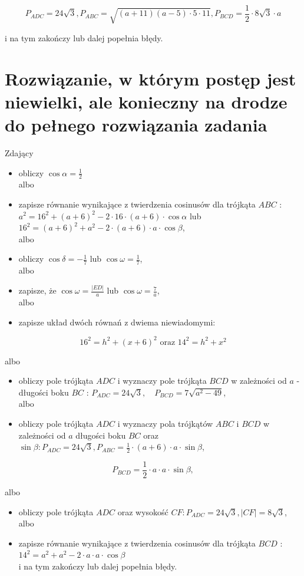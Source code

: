 \documentclass[10pt]{article}
\begin{document}
$$
P_{A D C}=24 \sqrt{3}, P_{A B C}=\sqrt{(a+11)(a-5) \cdot 5 \cdot 11}, P_{B C D}=\frac{1}{2} \cdot 8 \sqrt{3} \cdot a
$$

i na tym zakończy lub dalej popełnia błędy.

\section*{Rozwiązanie, w którym postęp jest niewielki, ale konieczny na drodze do pełnego rozwiązania zadania}
Zdający

\begin{itemize}
  \item obliczy $\cos \alpha=\frac{1}{2}$\\
albo
  \item zapisze równanie wynikające z twierdzenia cosinusów dla trójkąta $A B C$ : $a^{2}=16^{2}+(a+6)^{2}-2 \cdot 16 \cdot(a+6) \cdot \cos \alpha$ lub $16^{2}=(a+6)^{2}+a^{2}-2 \cdot(a+6) \cdot a \cdot \cos \beta$,\\
albo
  \item obliczy $\cos \delta=-\frac{1}{7}$ lub $\cos \omega=\frac{1}{7}$,\\
albo
  \item zapisze, że $\cos \omega=\frac{|E D|}{a}$ lub $\cos \omega=\frac{7}{a}$,\\
albo
  \item zapisze układ dwóch równań z dwiema niewiadomymi:
\end{itemize}

$$
16^{2}=h^{2}+(x+6)^{2} \text { oraz } 14^{2}=h^{2}+x^{2}
$$

albo

\begin{itemize}
  \item obliczy pole trójkąta $A D C$ i wyznaczy pole trójkąta $B C D$ w zależności od $a$ - długości boku $B C$ : $P_{A D C}=24 \sqrt{3}, \quad P_{B C D}=7 \sqrt{a^{2}-49}$,\\
albo
  \item obliczy pole trójkąta $A D C$ i wyznaczy pola trójkątów $A B C$ i $B C D$ w zależności od $a$ długości boku $B C$ oraz $\sin \beta: P_{A D C}=24 \sqrt{3}, P_{A B C}=\frac{1}{2} \cdot(a+6) \cdot a \cdot \sin \beta$,
\end{itemize}

$$
P_{B C D}=\frac{1}{2} \cdot a \cdot a \cdot \sin \beta,
$$

albo

\begin{itemize}
  \item obliczy pole trójkąta $A D C$ oraz wysokość $C F: P_{A D C}=24 \sqrt{3},|C F|=8 \sqrt{3}$,\\
albo
  \item zapisze równanie wynikające z twierdzenia cosinusów dla trójkąta $B C D$ :\\
$14^{2}=a^{2}+a^{2}-2 \cdot a \cdot a \cdot \cos \beta$\\
i na tym zakończy lub dalej popełnia błędy.
\end{itemize}
\end{document}

